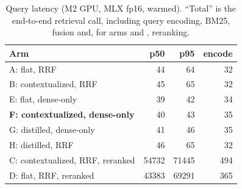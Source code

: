 \begin{table}[t]
\centering
\small
\caption{Query latency (M2 GPU, MLX fp16, warmed). ``Total'' is the end-to-end retrieval call, including query encoding, BM25, fusion and, for arms  and , reranking.}
\label{tab:latency}
\begin{tabular}{lrrr}
\toprule
Arm & p50 & p95 & encode \\
\midrule
A: flat, RRF & 44 & 64 & 32 \\
B: contextualized, RRF & 45 & 65 & 32 \\
E: flat, dense-only & 39 & 42 & 34 \\
\textbf{F: contextualized, dense-only} & 40 & 43 & 35 \\
G: distilled, dense-only & 41 & 46 & 35 \\
H: distilled, RRF & 46 & 65 & 32 \\
C: contextualized, RRF, reranked & 54732 & 71445 & 494 \\
D: flat, RRF, reranked & 43383 & 69291 & 365 \\
\bottomrule
\end{tabular}
\end{table}

